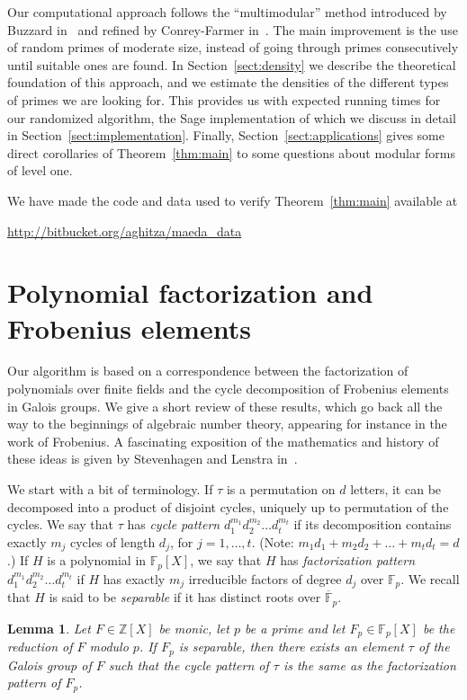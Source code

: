 \documentclass[11pt]{article}
\theoremstyle{plain}
\newtheorem{lemma}[theorem]{Lemma}
\theoremstyle{definition}
\theoremstyle{remark}
\numberwithin{equation}{section}
\newcommand{\ZZ}{\mathbb{Z}}
\newcommand{\FF}{\mathbb{F}}
\begin{document}
Our computational approach follows the ``multimodular'' method introduced by
Buzzard in~\cite{Buzzard} and refined by Conrey-Farmer in~\cite{ConreyFarmer}.
The main improvement is the use of random primes of moderate size, instead of
going through primes consecutively until suitable ones are found.  In
Section~\ref{sect:density} we describe the theoretical foundation of this
approach, and we estimate the densities of the different types of primes we
are looking for.  This provides us with expected running times for our
randomized algorithm, the Sage implementation of which we discuss in detail in
Section~\ref{sect:implementation}.  Finally, Section~\ref{sect:applications}
gives some direct corollaries of Theorem~\ref{thm:main} to some questions
about modular forms of level one.

We have made the code and data used to verify Theorem~\ref{thm:main} available
at 

\centerline{\url{http://bitbucket.org/aghitza/maeda_data}}

\section{Polynomial factorization and Frobenius elements}
\label{sect:frobenius}
Our algorithm is based on a correspondence between the factorization of
polynomials over finite fields and the cycle decomposition of Frobenius
elements in Galois groups.  We give a short review of these
results, which go back all the way to the beginnings of algebraic number theory,
appearing for instance in the work of Frobenius.  A fascinating exposition of the
mathematics and history of these ideas is given by Stevenhagen and Lenstra
in~\cite{StevenhagenLenstra}.

We start with a bit of terminology.  If $\tau$ is a permutation on $d$ letters, 
it can be decomposed into a product of disjoint cycles, uniquely up to
permutation of the cycles.  We say that $\tau$ has \emph{cycle pattern}
$d_1^{m_1}d_2^{m_2}\ldots d_t^{m_t}$ if its decomposition contains exactly
$m_j$ cycles of length $d_j$, for $j=1,\ldots,t$.  
  (Note: $m_1d_1+m_2d_2+\ldots +m_td_t=d$.) 
If $H$ is a polynomial in
$\FF_p[X]$, we say that $H$ has \emph{factorization pattern}
$d_1^{m_1}d_2^{m_2}\ldots d_t^{m_t}$ if $H$ has exactly $m_j$ irreducible
factors of degree $d_j$ over $\FF_p$.  We recall that $H$ is said to be
\emph{separable} if it has distinct roots over $\overline{\FF}_p$.

\begin{lemma}
  \label{lem:frobenius}
  Let $F\in\ZZ[X]$ be monic, let $p$ be a prime and let $F_p\in\FF_p[X]$ be
  the reduction of $F$ modulo $p$.  If $F_p$ is separable, then there exists
  an element $\tau$ of the Galois group of $F$ such that the cycle pattern of
  $\tau$ is the same as the factorization pattern of $F_p$.
\end{lemma}
\end{document}
